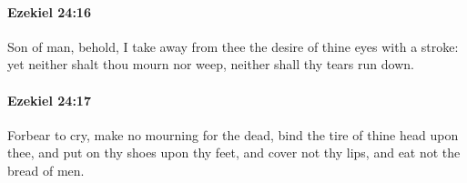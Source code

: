 		\paragraph{Ezekiel 24:16} %
			\label{EZEKIEL-24-16}

			Son of man, behold, I take away from thee the desire of thine eyes with a stroke: yet neither shalt thou mourn nor weep, neither shall thy tears run down.


		\paragraph{Ezekiel 24:17} %
			\label{EZEKIEL-24-17}

			Forbear to cry, make no mourning for the dead, bind the tire of thine head upon thee, and put on thy shoes upon thy feet, and cover not thy lips, and eat not the bread of men.


